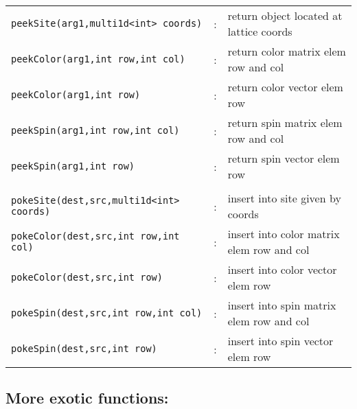 \documentclass[12pt,letterpaper]{article}
\begin{document}
\begin{flushleft}
\begin{tabular}{lcp{4.0in}}
\verb|peekSite(arg1,multi1d<int> coords)|&:& return object located at lattice coords\\
\verb|peekColor(arg1,int row,int col)|   &:& return color matrix elem row and col\\
\verb|peekColor(arg1,int row)|           &:& return color vector elem row\\
\verb|peekSpin(arg1,int row,int col)|   &:& return spin matrix elem row and col\\
\verb|peekSpin(arg1,int row)|            &:& return spin vector elem row\\
&&\\
\verb|pokeSite(dest,src,multi1d<int> coords)|&:& insert into site given by coords\\
\verb|pokeColor(dest,src,int row,int col)|   &:& insert into color matrix elem row and col\\
\verb|pokeColor(dest,src,int row)|           &:& insert into color vector elem row\\
\verb|pokeSpin(dest,src,int row,int col)|   &:& insert into spin matrix elem row and col\\
\verb|pokeSpin(dest,src,int row)|            &:& insert into spin vector elem row\\
\end{tabular}
\end{flushleft}


\medskip

\subsection{More exotic functions:}
\label{sec:otherfuncs}
\end{document}
